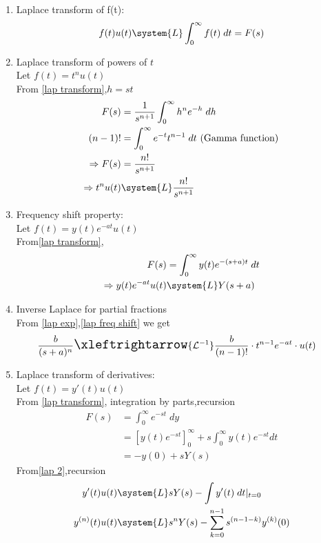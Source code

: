 \begin{enumerate}[label=\thechapter.\arabic*,ref=\thechapter.\theenumi]
\item Laplace transform of f(t):
\begin{align}
        f(t)u(t)\system{L}\int_{0}^{\infty}f(t)\; dt=F(s)\label{lap transform}
\end{align}
\item Laplace transform of powers of $t$\\ 
        Let $f(t)=t^nu(t)$\\
From \eqref{lap transform},$h=st$
\begin{align}
        F(s)&=\frac{1}{s^{n+1}}\int_{0}^{\infty}h^ne^{-h}\;dh\label{lap 1}\\
        (n-1)!&=\int_0^\infty e^{-t}t^{n-1}\;dt\text{ (Gamma function)}\label{gamma}\\
        \Rightarrow F(s)&=\frac{n!}{s^{n+1}}\\
        \Rightarrow t^nu(t)&\system{L}\frac{n!}{s^{n+1}}\label{lap exp}
\end{align}
\item Frequency shift property:\\
        Let $f(t)=y(t)e^{-at}u(t)$\\
From\eqref{lap transform},
\begin{align}
        F(s)&=\int_0^{\infty}y(t)e^{-(s+a)t}\;dt\\
        \Rightarrow y(t)e^{-at}u(t)&\system{L}Y(s+a)\label{lap freq shift}
\end{align}
\item Inverse Laplace for partial fractions\\
From \eqref{lap exp},\eqref{lap freq shift} we get
\begin{align}
    &\frac{b}{(s+a)^n}\Large\xleftrightarrow{\mathcal{L}^{-1}}\frac{b}{(n-1)!}\cdot t^{n-1} e^{-at}\cdot u(t)\label{inv lap (partial fractions)}
\end{align}
\item Laplace transform of derivatives:\\
        Let $f(t)=y'(t)u(t)$\\
From \eqref{lap transform}, integration by parts,recursion
\begin{align}
        F(s)&=\int_{0}^\infty e^{-st}\; dy\\
        &=[y(t)e^{-st}]_0^\infty+s\int_0^\infty y(t)e^{-st}dt\\
        &=-y(0)+sY(s)\label{lap 2}
\end{align}
From\eqref{lap 2},recursion
\begin{align}
        y'(t)u(t)&\system{L}sY(s)-\int y'(t)\;dt\vert_{t=0}\\
        y^{(n)}(t)u(t)&\system{L}s^nY(s)-\sum\limits_{k=0}^{n-1}s^{(n-1-k)}y^{(k)}(0)\label{lap (derivatives)}
\end{align}
\end{enumerate}
